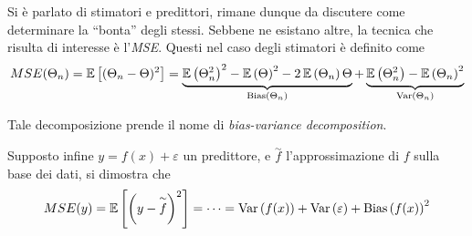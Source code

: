 \documentclass{subfiles}
\begin{document}
Si è parlato di stimatori e predittori, rimane dunque da discutere come determinare la ``bonta'' degli stessi.
Sebbene ne esistano altre, la tecnica che risulta di interesse è l'\emph{MSE}.
Questi nel caso degli stimatori è definito come
$$
    MSE(\Theta_{n}) =  \Expected*{(\Theta_{n} - \Theta)^{2}} %
    = \underbrace{\Expected{\Theta_{n}^{2}}^{2} - \Expected{\Theta}^{2} - 2\Expected{\Theta_{n}}\Theta}_{\Bias{\Theta_{n}}} %
    + \underbrace{\Expected{\Theta_{n}^{2}} - \Expected{\Theta_{n}}^{2}}_{\Var{\Theta_{n}}}
$$
\begin{Remark*}
    Tale decomposizione prende il nome di \emph{bias-variance decomposition}.
\end{Remark*}
Supposto infine $y = f(x) + \varepsilon$ un predittore, e \(\overset{\sim}{f}\) l'approssimazione di \(f\) sulla base dei dati, si dimostra che
$$
    MSE(y) = \Expected*{\left(y - \overset{\sim}{f}\right)^{2}} = \cdots = \Var{f(x)} + \Var{\varepsilon} + \Bias{f(x)}^{2}
$$
\end{document}
